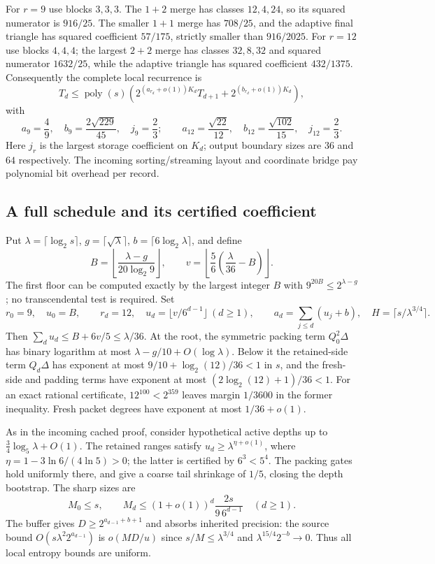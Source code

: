 For $r=9$ use blocks $3,3,3$.  The $1+2$ merge has classes $12,4,24$,
so its squared numerator is $916/25$.  The smaller $1+1$ merge has
$708/25$, and the adaptive final triangle has squared coefficient
$57/175$, strictly smaller than $916/2025$.  For $r=12$ use blocks
$4,4,4$; the largest $2+2$ merge has classes $32,8,32$ and squared
numerator $1632/25$, while the adaptive triangle has squared coefficient
$432/1375$.  Consequently the complete local recurrence is
\[
 T_d\le\operatorname{poly}(s)\left(
       2^{(a_{r_d}+o(1))K_d}T_{d+1}
       +2^{(b_{r_d}+o(1))K_d}\right),
\]
with
\[
 a_9=\frac49,\quad b_9=\frac{2\sqrt{229}}{45},\quad j_9=\frac23;
 \qquad
 a_{12}=\frac{\sqrt{22}}{12},\quad
 b_{12}=\frac{\sqrt{102}}{15},\quad j_{12}=\frac23.
\]
Here $j_r$ is the largest storage coefficient on $K_d$; output boundary
sizes are $36$ and $64$ respectively.  The incoming sorting/streaming
layout and coordinate bridge pay polynomial bit overhead per record.

\subsection{A full schedule and its certified coefficient}
Put $\lambda=\lceil\log_2s\rceil$, $g=\lceil\sqrt\lambda\rceil$,
$b=\lceil6\log_2\lambda\rceil$, and define
\[
 B=\left\lfloor\frac{\lambda-g}{20\log_2 9}\right\rfloor,
 \qquad v=\left\lfloor\frac56\left(\frac\lambda{36}-B\right)\right\rfloor.
\]
The first floor can be computed exactly by the largest integer $B$ with
$9^{20B}\le2^{\lambda-g}$; no transcendental test is required.  Set
\[
 r_0=9,\quad u_0=B,\qquad
 r_d=12,\quad u_d=\lfloor v/6^{d-1}\rfloor\ (d\ge1),\qquad
 a_d=\sum_{j\le d}(u_j+b),\quad H=\lceil s/\lambda^{3/4}\rceil.
\]
Then $\sum_du_d\le B+6v/5\le\lambda/36$.
At the root, the symmetric packing term $Q_0^2\Delta$ has binary
logarithm at most $\lambda-g/10+O(\log\lambda)$.  Below it the
retained-side term $Q_d\Delta$ has exponent at most
$9/10+\log_2(12)/36<1$ in $s$, and the fresh-side and padding terms
have exponent at most $(2\log_2(12)+1)/36<1$.  For an exact rational
certificate, $12^{100}<2^{359}$ leaves margin $1/3600$ in the former
inequality.  Fresh packet degrees have exponent at most $1/36+o(1)$.

As in the incoming cached proof, consider hypothetical active depths up
to $\tfrac34\log_5\lambda+O(1)$.  The retained ranges satisfy
$u_d\ge\lambda^{\eta+o(1)}$, where
$\eta=1-3\ln6/(4\ln5)>0$; the latter is certified by $6^3<5^4$.
The packing gates hold uniformly there, and give a coarse tail shrinkage
of $1/5$, closing the depth bootstrap.  The sharp sizes are
\[
 M_0\le s,\qquad M_d\le(1+o(1))^d\frac{2s}{9\,6^{d-1}}\quad(d\ge1).
\]
The buffer gives $D\ge2^{a_{d-1}+b+1}$ and absorbs inherited precision:
the source bound $O(s\lambda^2 2^{a_{d-1}})$ is
$o(MD/u)$ since $s/M\le\lambda^{3/4}$ and
$\lambda^{15/4}2^{-b}\to0$.  Thus all local entropy bounds are uniform.

